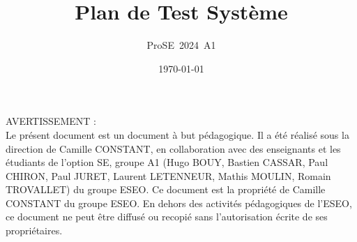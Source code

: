 \documentclass[a4paper,11pt,titlepage,french]{article}
\author{ProSE~2024~A1}        %
\title{Plan de Test Système}     %
\date{\normalsize\today}    %
\begin{document}
\maketitle

\BgThispage %
\vspace*{\fill}
\noindent
AVERTISSEMENT : \\
Le présent document est un document à but pédagogique.
Il a été réalisé sous la direction de Camille CONSTANT, en collaboration avec des enseignants et les étudiants de l'option SE, groupe A1 (Hugo BOUY, Bastien CASSAR, Paul CHIRON, Paul JURET, Laurent LETENNEUR, Mathis MOULIN, Romain TROVALLET) du groupe ESEO.
Ce document est la propriété de Camille CONSTANT du groupe ESEO. En dehors des activités pédagogiques de l'ESEO, ce document ne peut être diffusé ou recopié sans l'autorisation écrite de ses propriétaires.
\vspace*{\fill}
\clearpage

\newpage



\newpage


\tableofcontents
\newpage



\newpage


\newpage


\newpage


\newpage


\newpage


\newpage


\newpage


\newpage
\end{document}
